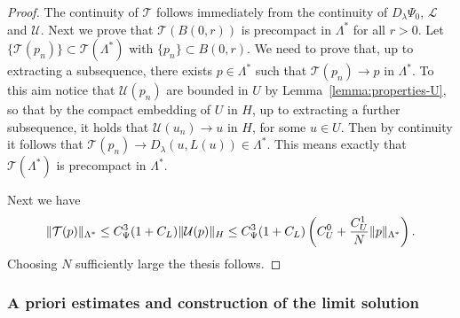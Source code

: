 \documentclass[a4paper,10pt,twoside]{amsbook}
\numberwithin{section}{chapter}
\numberwithin{equation}{chapter}
\theoremstyle{definition}
\DeclarePairedDelimiter{\norm}{\lVert}{\rVert}
\begin{document}
\begin{proof}
The continuity of $\mathcal{T}$ follows immediately from the continuity of $D_\lambda\Psi_0$, $\mathcal{L}$ and $\mathcal{U}$. Next we prove that $\mathcal{T}(B(0,r))$ is precompact in $\Lambda^*$ for all $r>0$. Let $\{\mathcal{T}(p_n)\}\subset\mathcal{T}(\Lambda^*)$ with $\{p_n\}\subset B(0,r)$. We need to prove that, up to extracting a subsequence, there exists $p\in\Lambda^*$ such that $\mathcal{T}(p_n)\to p$ in $\Lambda^*$. To this aim notice that $\mathcal{U}(p_n)$ are bounded in $U$ by Lemma~\ref{lemma:properties-U}, so that by the compact embedding of $U$ in $H$, up to extracting a further subsequence, it holds that $\mathcal{U}(u_n)\to u$ in $H$, for some $u\in U$. Then by continuity it follows that $\mathcal{T}(p_n)\to D_\lambda(u,L(u))\in\Lambda^*$. This means exactly that $\mathcal{T}(\Lambda^*)$ is precompact in $\Lambda^*$.

Next we have
\[
\norm{\mathcal{T}(p)}_{\Lambda^*}\le C_\Psi^3(1+C_L)\norm{\mathcal{U}(p)}_H\le C_\Psi^3(1+C_L)\left(C_U^0+\frac{C_U^1}{N}\norm{p}_{\Lambda^*}\right).
\]
Choosing $N$ sufficiently large the thesis follows.
\end{proof}

\subsubsection*{A priori estimates and construction of the limit solution}
\end{document}
